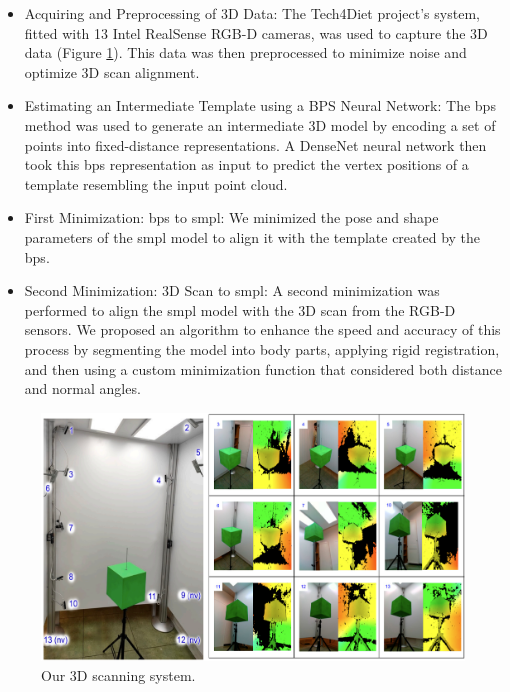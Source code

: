 \begin{itemize}
	\item Acquiring and Preprocessing of 3D Data: The Tech4Diet project's system, fitted
	      with 13 Intel RealSense RGB-D cameras, was used to capture the 3D data (Figure
	      \ref{fig:cameras_scan}). This data was then preprocessed to minimize noise and
	      optimize 3D scan alignment.

	\item Estimating an Intermediate Template using a BPS Neural Network: The \gls{bps}
	      method was used to generate an intermediate 3D model by encoding a set of
	      points into fixed-distance representations. A DenseNet neural network then took
	      this \gls{bps} representation as input to predict the vertex positions of a
	      template resembling the input point cloud.

	\item First Minimization: \gls{bps} to \gls{smpl}: We minimized the pose and shape
	      parameters of the \gls{smpl} model to align it with the template created by the
	      \gls{bps}.

	\item Second Minimization: 3D Scan to \gls{smpl}: A second minimization was performed
	      to align the \gls{smpl} model with the 3D scan from the RGB-D sensors. We
	      proposed an algorithm to enhance the speed and accuracy of this process by
	      segmenting the model into body parts, applying rigid registration, and then
	      using a custom minimization function that considered both distance and normal
	      angles.
\end{itemize}

\begin{figure}[H]
	\centering
	\includegraphics[width=\textwidth]{files/cameras_scan.png}
	\caption{Our 3D scanning system.}
	\label{fig:cameras_scan}
\end{figure}

